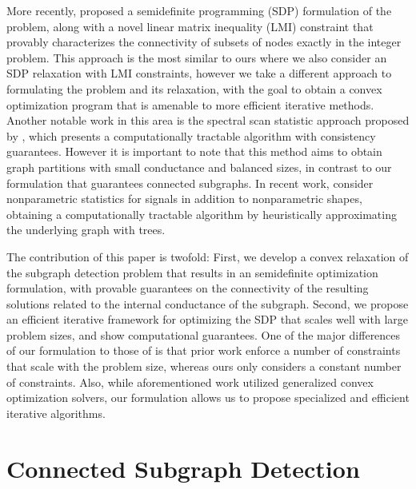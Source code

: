 \documentclass{article}
\begin{document}
More recently, \cite{aistats14,nips14} proposed a semidefinite programming (SDP) formulation of the problem, along with a novel linear matrix inequality (LMI) constraint that provably characterizes the connectivity of subsets of nodes exactly in the integer problem. This approach is the most similar to ours where we also consider an SDP relaxation with LMI constraints, however we take a different approach to formulating the problem and its relaxation, with the goal to obtain a convex optimization program that is amenable to more efficient iterative methods. Another notable work in this area is the spectral scan statistic approach proposed by \cite{sharpnack}, which presents a computationally tractable algorithm with consistency guarantees. However it is important to note that this method aims to obtain graph partitions with small conductance and balanced sizes, in contrast to our formulation that guarantees connected subgraphs. In recent work, \cite{wu} consider nonparametric statistics for signals in addition to nonparametric shapes, obtaining a computationally tractable algorithm by heuristically approximating the underlying graph with trees.

The contribution of this paper is twofold: First, we develop a convex relaxation of the subgraph detection problem that results in an semidefinite optimization formulation, with provable guarantees on the connectivity of the resulting solutions related to the internal conductance of the subgraph. Second, we propose an efficient iterative framework for optimizing the SDP that scales well with large problem sizes, and show computational guarantees. One of the major differences of our formulation to those of \cite{aistats14,nips14} is that prior work enforce a number of constraints that scale with the problem size, whereas ours only considers a constant number of constraints. Also, while aforementioned work utilized generalized convex optimization solvers, our formulation allows us to propose specialized and efficient iterative algorithms.  %



\section{Connected Subgraph Detection}
\end{document}
